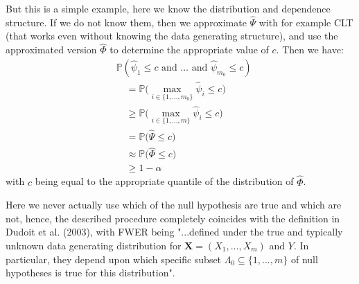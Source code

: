\documentclass[a4paper,12pt]{article}
\numberwithin{equation}{section}
\newcommand{\pr}{\mathbb{P}}        %
\begin{document}
But this is a simple example, here we know the distribution and dependence structure. If we do not know them, then we approximate $\hat{\Psi}$ with for example CLT (that works even without knowing the data generating structure), and use the approximated version $\hat{\Phi}$ to determine the appropriate value of $c$. Then we have:
\begin{align*}
&\pr (\hat{\psi}_1 \leq c \text{ and } \ldots \text{ and } \hat{\psi}_{m_0} \leq c) \\
&\quad = \pr \Big(\max_{i \in \{1, \ldots, m_0\}} \hat{\psi}_i  \leq c\Big) \\
&\quad  \geq  \pr \Big(\max_{i \in \{1, \ldots, m\}} \hat{\psi}_i  \leq c\Big) \\
&\quad = \pr \Big(\hat{\Psi} \leq c\Big)\\
&\quad \approx \pr \Big(\hat{\Phi} \leq c\Big) \\
&\quad \geq 1-\alpha 
 \end{align*}
with $c$ being equal to the appropriate quantile of the distribution of $\hat{\Phi}$.

Here we never actually use which of the null hypothesis are true and which are not, hence, the described procedure completely coincides with the definition in Dudoit et al. (2003), with FWER being "...defined under the true and typically unknown data generating distribution for $\mathbf{X} = (X_1, . . . , X_m)$ and $Y$. In particular, they depend upon which specific subset $\Lambda_0 \subseteq \{1, . . .,m\}$ of null hypotheses is true for this distribution". 
\end{document}
